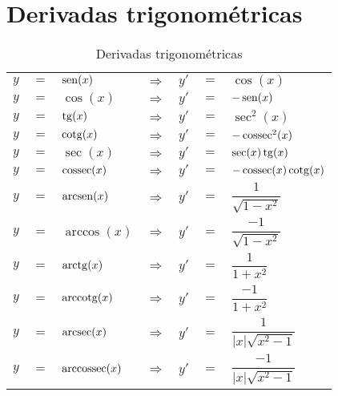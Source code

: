 \section{Derivadas trigonométricas}
	\begin{table}[H]
		\caption{Derivadas trigonométricas}
		\label{derivadas_trigometricas}
		\centering
		\begin{tabular}{|lclclcl|}
			$y$ & $=$ & $\operatorname{sen}(x)$       & $\Rightarrow$ & $y'$ & $=$ & $\cos(x)$                       \\
			$y$ & $=$ & $\cos(x)$       & $\Rightarrow$ & $y'$ & $=$ & $-\operatorname{sen}(x)$                      \\
			$y$ & $=$ & $\operatorname{tg}(x)$        & $\Rightarrow$ & $y'$ & $=$ & $\sec^2(x)$                     \\
			$y$ & $=$ & $\operatorname{cotg}(x)$      & $\Rightarrow$ & $y'$ & $=$ & $-\operatorname{cossec}^2(x)$                 \\
			$y$ & $=$ & $\sec(x)$       & $\Rightarrow$ & $y'$ & $=$ & $\sec(x)\operatorname{tg}(x)$                 \\
			$y$ & $=$ & $\operatorname{cossec}(x)$    & $\Rightarrow$ & $y'$ & $=$ & $-\operatorname{cossec}(x)\operatorname{cotg}(x)$           \\
			$y$ & $=$ & $\operatorname{arcsen}(x)$    & $\Rightarrow$ & $y'$ & $=$ & $\dfrac{1}{\sqrt{1 - x^2}}$     \\
			$y$ & $=$ & $\arccos(x)$    & $\Rightarrow$ & $y'$ & $=$ & $\dfrac{-1}{\sqrt{1 - x^2}}$    \\
			$y$ & $=$ & $\operatorname{arctg}(x)$     & $\Rightarrow$ & $y'$ & $=$ & $\dfrac{1}{1 + x^2}$            \\
			$y$ & $=$ & $\operatorname{arccotg}(x)$   & $\Rightarrow$ & $y'$ & $=$ & $\dfrac{-1}{1 + x^2}$           \\
			$y$ & $=$ & $\operatorname{arcsec}(x)$    & $\Rightarrow$ & $y'$ & $=$ & $\dfrac{1}{|x|\sqrt{x^2 - 1}}$  \\
			$y$ & $=$ & $\operatorname{arccossec}(x)$ & $\Rightarrow$ & $y'$ & $=$ & $\dfrac{-1}{|x|\sqrt{x^2 - 1}}$
		\end{tabular}		
	\end{table}